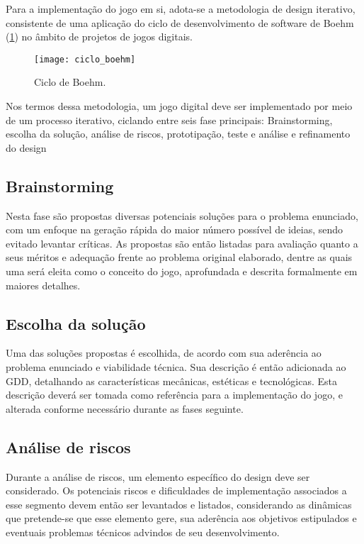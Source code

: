 Para a implementação do jogo em si, adota-se a metodologia de design iterativo, consistente de uma aplicação do ciclo de desenvolvimento de software de Boehm (\ref{fig:ciclo-boehm}) no âmbito de projetos de jogos digitais.

\begin{figure}[ht]
	\centering
	\caption{Ciclo de Boehm.}
	\texttt{[image: ciclo\_boehm]}
	\label{fig:ciclo-boehm}
\end{figure}

Nos termos dessa metodologia, um jogo digital deve ser implementado por meio de um processo iterativo, ciclando entre seis fase principais: Brainstorming, escolha da solução, análise de riscos, prototipação, teste e análise e refinamento do design

\subsection{Brainstorming}\label{subsec-met-brainstorming}

Nesta fase são propostas diversas potenciais soluções para o problema enunciado, com um enfoque na geração rápida do maior número possível de ideias, sendo evitado levantar críticas. As propostas são então listadas para avaliação quanto a seus méritos e adequação frente ao problema original elaborado, dentre as quais uma será eleita como o conceito do jogo, aprofundada e descrita formalmente em maiores detalhes.

\subsection{Escolha da solução}\label{subsec-met-escolha-solucao}

Uma das soluções propostas é escolhida, de acordo com sua aderência ao problema enunciado e viabilidade técnica. Sua descrição é então adicionada ao GDD, detalhando as características mecânicas, estéticas e tecnológicas. Esta descrição deverá ser tomada como referência para a implementação do jogo, e alterada conforme necessário durante as fases seguinte.

\subsection{Análise de riscos}\label{subsec-met-analise-riscos}

Durante a análise de riscos, um elemento específico do design deve ser considerado. Os potenciais riscos e dificuldades de implementação associados a esse segmento devem então ser levantados e listados, considerando as dinâmicas que pretende-se que esse elemento gere, sua aderência aos objetivos estipulados e eventuais problemas técnicos advindos de seu desenvolvimento.

